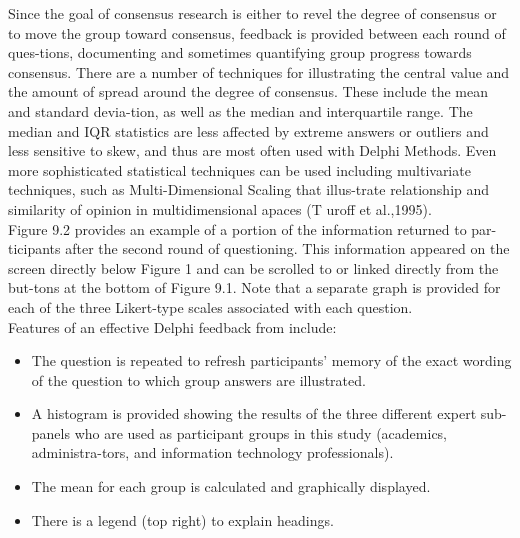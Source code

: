 \documentclass[12pt]{article}
\begin{document}
Since the goal of consensus research is either to revel the degree of consensus or to move the group toward consensus, feedback is provided between each round of ques-tions, documenting and sometimes quantifying group progress towards consensus. There are a number of techniques for illustrating the central value and the amount of spread around the degree of consensus. These include the mean and standard devia-tion, as well as the median and interquartile range. The median and IQR statistics are less affected by extreme answers or outliers and less sensitive to skew, and thus are most often used with Delphi Methods. Even more sophisticated statistical techniques can be used including multivariate techniques, such as Multi-Dimensional Scaling that illus-trate relationship and similarity of opinion in multidimensional apaces (T uroff et al.,1995).\\


\hspace{0.5cm} Figure 9.2 provides an example of a portion of the information returned to par-ticipants after the second round of questioning. This information appeared on the screen directly below Figure 1 and can be scrolled to or linked directly from the but-tons at the bottom of Figure 9.1. Note that a separate graph is provided for each of the three Likert-type scales associated with each question.\\
\hspace{0.5cm} Features of an effective Delphi feedback from include:\\

\vspace*{0.3cm}
\begin{itemize}
  \item The question is repeated to refresh participants' memory of the exact wording of the question to which group answers are illustrated.\\
  \item A histogram is provided showing the results of the three different expert sub-panels who are used as participant groups in this study (academics, administra-tors, and information technology professionals).\\
  \item The mean for each group is calculated and graphically displayed.\\
  \item There is a legend (top right) to explain headings.\\
\end{itemize}
\end{document}
